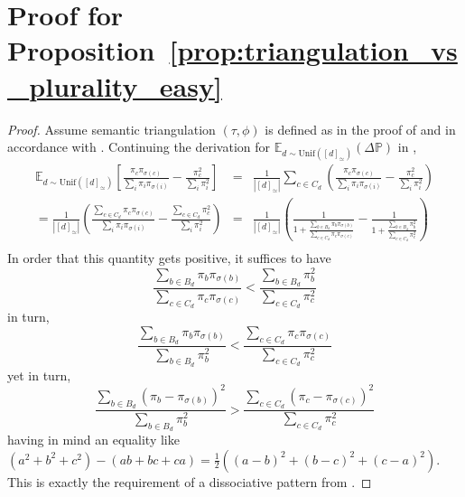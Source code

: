\documentclass[acmsmall,screen,nonacm]{acmart}
\begin{document}
\section{Proof for Proposition~\ref{prop:triangulation_vs_plurality_easy}}
\label{sec:proof_prop_general}

\begin{proof}
Assume semantic triangulation $(\tau, \phi)$ is defined as in the proof of  and in accordance with . Continuing the derivation for $\mathds{E}_{d\sim\mathrm{Unif}([d]_\simeq)}(\Delta \mathds{P})$ in ,
\begin{eqnarray*}
\mathds{E}_{d\sim\mathrm{Unif}([d]_\simeq)} \left[\frac{\pi_c \pi_{\sigma(c)}}{\sum\limits_{i}\pi_i \pi_{\sigma(i)}} - \frac{\pi_c^2}{\sum\limits_{i}\pi_i^2} \right]
&=& \frac{1}{|[d]_{\simeq}|}\sum_{c\in C_d}\left(\frac{\pi_c \pi_{\sigma(c)}}{\sum\limits_{i}\pi_i \pi_{\sigma(i)}} - \frac{\pi_c^2}{\sum\limits_{i}\pi_i^2} \right)\\
= \frac{1}{|[d]_{\simeq}|}\left(\frac{\sum_{c\in C_d}\pi_c \pi_{\sigma(c)}}{\sum\limits_{i}\pi_i \pi_{\sigma(i)}} - \frac{\sum_{c\in C_d}\pi_c^2}{\sum\limits_{i}\pi_i^2}\right)
&=& \frac{1}{|[d]_{\simeq}|}\left(\frac{1}{1+\frac{\sum_{b\in B_d}\pi_b \pi_{\sigma(b)}}{\sum_{c\in C_d}\pi_c \pi_{\sigma(c)}}} - \frac{1}{1+\frac{\sum_{b\in B_d}\pi_b^2}{\sum_{c\in C_d}\pi_c^2}}\right) \\
\end{eqnarray*}
In order that this quantity gets positive, it suffices to have
\begin{equation*}
\frac{\sum_{b\in B_d}\pi_b \pi_{\sigma(b)}}{\sum_{c\in C_d}\pi_c \pi_{\sigma(c)}}
<\frac{\sum_{b\in B_d}\pi_b^2}{\sum_{c\in C_d}\pi_c^2}
\end{equation*}
in turn,
\begin{equation*}
\frac{\sum_{b\in B_d}\pi_b \pi_{\sigma(b)}}{\sum_{b\in B_d}\pi_b^2}
<\frac{\sum_{c\in C_d}\pi_c \pi_{\sigma(c)}}{\sum_{c\in C_d}\pi_c^2}
\end{equation*}
yet in turn,
\begin{equation*}
\frac{\sum_{b\in B_d}(\pi_b-\pi_{\sigma(b)})^2}{\sum_{b\in B_d}\pi_b^2}
>\frac{\sum_{c\in C_d}(\pi_c-\pi_{\sigma(c)})^2}{\sum_{c\in C_d}\pi_c^2}
\end{equation*}
having in mind an equality like $(a^2+b^2+c^2)-(ab+bc+ca)=\frac{1}{2}((a-b)^2+(b-c)^2+(c-a)^2)$. This is exactly the requirement of a dissociative pattern from .
\end{proof}
\end{document}
